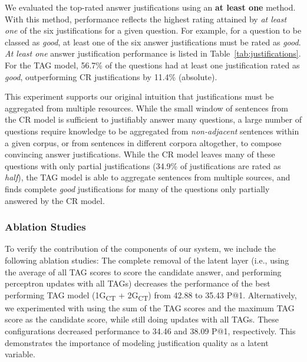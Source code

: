 {\begin{table}[t]
\begin{center}
\end{center}
\end{table}

We evaluated the top-rated answer justifications using an {\bf at least one} method.  With this method, performance reflects the highest rating attained by \emph{at least one} of the six justifications for a given question. For example, for a question to be classed as {\em good}, at least one of the six answer justifications must be rated as {\em good}.  \emph{At least one} answer justification performance is listed in Table~\ref{tab:justifications}. For the TAG model, 56.7\% of the questions had at least one justification rated as {\em good}, outperforming CR justifications by 11.4\% (absolute).  


This experiment supports our original intuition that justifications must be aggregated from multiple resources. While the small window of sentences from the CR model is sufficient to justifiably answer many questions, a large number of questions require knowledge to be aggregated from {\em non-adjacent} sentences within a given corpus, or from sentences in different corpora altogether, to compose convincing answer justifications.  While the CR model leaves many of these questions with only partial justifications (34.9\% of justifications are rated as {\em half}), the TAG model  is able to aggregate sentences from multiple sources, and finds complete {\em good} justifications for many of the questions only partially answered by the CR model.


\subsubsection{Ablation Studies}
\label{sec:controls}
To verify the contribution of the components of our system, we include the following ablation studies:
{} The complete removal of the latent layer (i.e., using the average of all TAG scores to score the candidate answer, and performing perceptron updates with all TAGs) decreases the performance of the best performing TAG model (1G\textsubscript{CT} + 2G\textsubscript{CT}) from 42.88 to 35.43 P@1.  Alternatively, we experimented with using the sum of the TAG scores and the maximum TAG score as the candidate score, while still doing updates with all TAGs.  These configurations decreased performance to 34.46 and 38.09 P@1, respectively. This demonstrates the importance of modeling justification quality as a latent variable.

}
